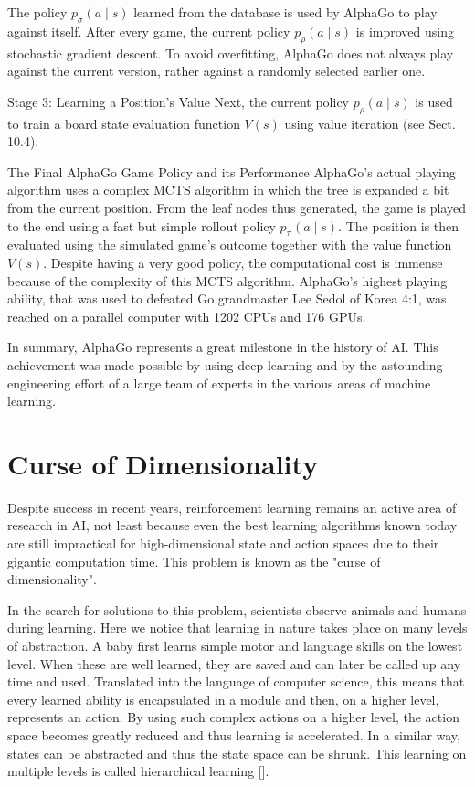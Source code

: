 \documentclass[10pt]{book}
\begin{document}
The policy $p_{\sigma}(a \mid s)$ learned from the database is used by AlphaGo to play against itself. After every game, the current policy $p_{\rho}(a \mid s)$ is improved using stochastic gradient descent. To avoid overfitting, AlphaGo does not always play against the current version, rather against a randomly selected earlier one.

Stage 3: Learning a Position's Value Next, the current policy $p_{\rho}(a \mid s)$ is used to train a board state evaluation function $V(s)$ using value iteration (see Sect. 10.4).

The Final AlphaGo Game Policy and its Performance AlphaGo's actual playing algorithm uses a complex MCTS algorithm in which the tree is expanded a bit from the current position. From the leaf nodes thus generated, the game is played to the end using a fast but simple rollout policy $p_{\pi}(a \mid s)$. The position is then evaluated using the simulated game's outcome together with the value function $V(s)$. Despite having a very good policy, the computational cost is immense because of the complexity of this MCTS algorithm. AlphaGo's highest playing ability, that was used to defeated Go grandmaster Lee Sedol of Korea 4:1, was reached on a parallel computer with 1202 CPUs and 176 GPUs.

In summary, AlphaGo represents a great milestone in the history of AI. This achievement was made possible by using deep learning and by the astounding engineering effort of a large team of experts in the various areas of machine learning.

\section{Curse of Dimensionality}
Despite success in recent years, reinforcement learning remains an active area of research in AI, not least because even the best learning algorithms known today are still impractical for high-dimensional state and action spaces due to their gigantic computation time. This problem is known as the "curse of dimensionality".

In the search for solutions to this problem, scientists observe animals and humans during learning. Here we notice that learning in nature takes place on many levels of abstraction. A baby first learns simple motor and language skills on the lowest level. When these are well learned, they are saved and can later be called up any time and used. Translated into the language of computer science, this means that every learned ability is encapsulated in a module and then, on a higher level, represents an action. By using such complex actions on a higher level, the action space becomes greatly reduced and thus learning is accelerated. In a similar way, states can be abstracted and thus the state space can be shrunk. This learning on multiple levels is called hierarchical learning [\cite{barto2003hierarchical}].
\end{document}
